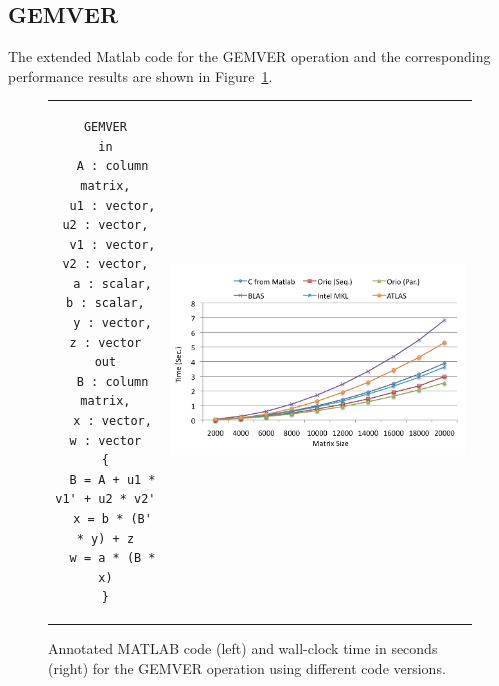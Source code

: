 \documentclass[11pt]{article}
\begin{document}
\subsection{GEMVER}


The extended Matlab code for the GEMVER operation and the corresponding performance results are shown in Figure~\ref{fig:gemver}.



\begin{figure}[htp]
\centering
\begin{tabular}{cc}
\begin{minipage}[b]{.3\textwidth}
\footnotesize
\begin{verbatim}
GEMVER
in
  A : column matrix,
  u1 : vector, u2 : vector,
  v1 : vector, v2 : vector,
  a : scalar, b : scalar,
  y : vector, z : vector
out
  B : column matrix,
  x : vector, w : vector
{
  B = A + u1 * v1' + u2 * v2'
  x = b * (B' * y) + z
  w = a * (B * x)
}
\end{verbatim}
\end{minipage}
&
\begin{minipage}[b]{.6\textwidth}
\includegraphics[width=\textwidth]{figures/gemver.png}
\end{minipage}\\
\end{tabular}
\caption{Annotated MATLAB code (left) and wall-clock time in seconds (right) for the GEMVER operation using different code versions.}
\label{fig:gemver}
\end{figure}

%
\end{document}
